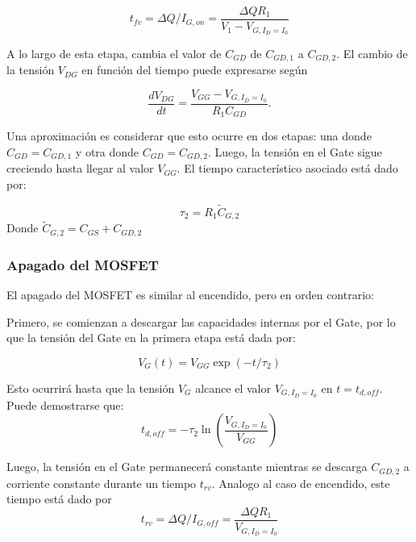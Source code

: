 \documentclass[e4_tp1_main.tex]{subfiles}
\begin{document}
\begin{equation}
t_{fv} = \Delta Q/I_{G,on} = \frac{\Delta Q R_1}{V_{1}-V_{G,I_D=I_0}}
\end{equation}

A lo largo de esta etapa, cambia el valor de $C_{GD}$ de $C_{GD,1}$ a $C_{GD,2}$. El cambio de la tensión $V_{DG}$ en función del tiempo puede expresarse según

\begin{equation}
\frac{dV_{DG}}{dt} = \frac{V_{GG}-V_{G,I_D=I_0}}{R_1C_{GD}}.
\end{equation}

Una aproximación es considerar que esto ocurre en dos etapas: una donde $C_{GD} = C_{GD,1}$ y otra donde $C_{GD} = C_{GD,2}$. Luego, la tensión en el Gate sigue creciendo hasta llegar al valor $V_{GG}$. El tiempo característico asociado está dado por:

\begin{equation}
\tau_2 = R_1\tilde{C}_{G,2}
\end{equation}
Donde $\tilde{C}_{G,2} = C_{GS} + C_{GD,2}$

\subsubsection{Apagado del MOSFET}

El apagado del MOSFET es similar al encendido, pero en orden contrario:

Primero, se comienzan a descargar las capacidades internas por el Gate, por lo que la tensión del Gate en la primera etapa está dada por:

\begin{equation}
V_G(t) = V_{GG} \exp(-t/\tau_2)
\end{equation}

Esto ocurrirá hasta que la tensión $V_G$ alcance el valor $V_{G,I_D=I_0}$ en $t=t_{d,off}$. Puede demostrarse que:
\begin{equation}
t_{d,off}= -\tau_2\ln\left(\frac{V_{G,I_D=I_0}}{V_{GG}}\right)
\end{equation}

Luego, la tensión en el Gate permanecerá constante mientras se descarga $C_{GD,2}$ a corriente constante durante un tiempo $t_{rv}$. Analogo al caso de encendido, este tiempo está dado por
\begin{equation}
t_{rv} = \Delta Q/I_{G,off} = \frac{\Delta Q R_1}{V_{G,I_D=I_0}}
\end{equation}
\end{document}
